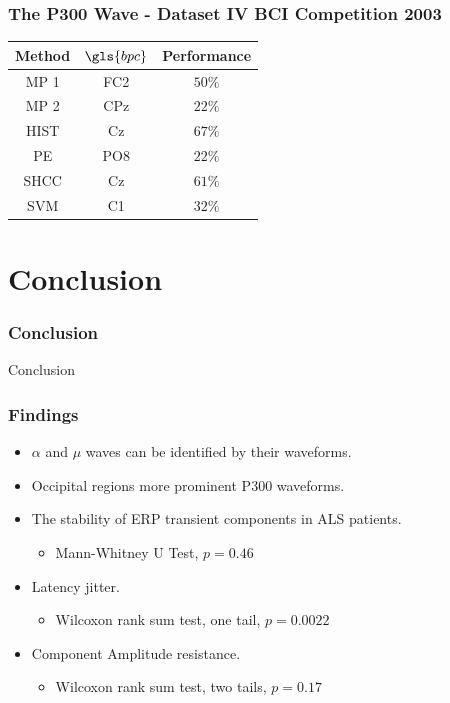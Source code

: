 \documentclass[aspectratio=169]{beamer}
\newcommand\Fontre{\fontsize{16}{16.2}\selectfont}
\begin{document}
\begin{frame}
\frametitle{The P300 Wave - Dataset IV BCI Competition 2003 }    
\begin{table}[h!]
\centering
\begin{tabular}{ccc}
\toprule
\textbf{Method}	& \textbf{$\gls{bpc}$} &  \textbf{Performance} \\
\midrule
MP 1 & FC2  & $50\%$ \\
MP 2 & CPz & $22\%$ \\
HIST  & Cz & $67\%$ \\
PE     & PO8 & $22\%$ \\
SHCC & Cz & $61\%$ \\
SVM     & C1  & $32\%$ \\
\bottomrule
\end{tabular}
\label{tab:bcicompetitionresults}
\end{table}
\end{frame} 
    
    \section{Conclusion}
\begin{frame}
\frametitle{Conclusion}
\begin{center}
\LARGE Conclusion
\end{center}
\end{frame}

\begin{frame}
\frametitle{Findings}
\begin{center}
\begin{itemize}
\item \Fontre $\alpha$ and $\mu$ waves can be identified by their waveforms.
\item \Fontre Occipital regions more prominent P300 waveforms.
\item \Fontre The stability of ERP transient components in ALS patients. 
\begin{itemize}
\item Mann-Whitney U Test, $p=0.46$
\end{itemize}
\item \Fontre Latency jitter. 
\begin{itemize}
\item Wilcoxon rank sum test, one tail, $p=0.0022$
\end{itemize}
\item \Fontre Component Amplitude resistance. 
\begin{itemize}
\item Wilcoxon rank sum test, two tails, $p=0.17$
\end{itemize}
\end{itemize}
\end{center}
\end{frame}
\end{document}
